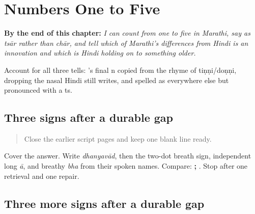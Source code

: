
\chapter{Numbers One to Five}
\label{ch:numbers-one-to-five}

\begin{chapteropening}
\textbf{By the end of this chapter:} \emph{I can count from one to five in Marathi, say  as tsār rather than chār, and tell which of Marathi's differences from Hindi is an innovation and which is Hindi holding on to something older.}

Account for all three tells: 's final n copied from the rhyme of tiṇṇi/doṇṇi,  dropping the nasal Hindi  still writes, and  spelled as everywhere else but pronounced with a ts.
\end{chapteropening}

\section[visarga / aa / bha]{Three signs after a durable gap}

\label{lesson:MR-R09-script-a-r3}



\begin{quote}
Close the earlier script pages and keep one blank line ready.
\end{quote}

\begin{tcolorbox}[breakable,colback=teal!4,colframe=teal!35!black,title={Before you move on}]
Cover the answer. Write \emph{dhanyavād}, then the two-dot breath sign, independent long \emph{ā}, and breathy \emph{bha} from their spoken names. Compare: \textbf{;   }. Stop after one retrieval and one repair.
\end{tcolorbox}
\section[e / anusvara / ta]{Three more signs after a durable gap}

\label{lesson:MR-R09-script-b-r3}



